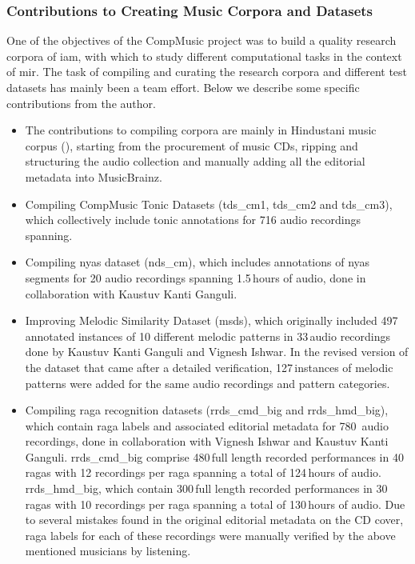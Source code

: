 \subsubsection*{Contributions to Creating Music Corpora and Datasets}

One of the objectives of the CompMusic project was to build a quality research corpora of \gls{iam}, with which to study different computational tasks in the context of \gls{mir}. The task of compiling and curating the research corpora and different test datasets has mainly been a team effort. Below we describe some specific contributions from the author. 

\begin{itemize}
	
	\item The contributions to compiling corpora are mainly in Hindustani music corpus (), starting from the procurement of music CDs, ripping and structuring the audio collection and manually adding all the editorial metadata into MusicBrainz. 
	
	\item Compiling CompMusic Tonic Datasets (\acrshort{tds_cm1}, \acrshort{tds_cm2} and \acrshort{tds_cm3}), which collectively include tonic annotations for 716 audio recordings spanning. 
	
	\item Compiling \Gls{nyas} dataset (\acrshort{nds_cm}), which includes annotations of \gls{nyas} segments for 20 audio recordings spanning 1.5\,hours of audio, done in 
	collaboration with Kaustuv Kanti Ganguli. 
	\item Improving Melodic Similarity Dataset (\acrshort{msds}), which originally included 497 annotated instances of 10 different melodic patterns in 33\,audio recordings done by Kaustuv Kanti Ganguli and Vignesh Ishwar. In the revised version of the dataset that came after a detailed verification, 127\,instances of melodic patterns were added for the same audio recordings and pattern categories. 
	\item Compiling \Gls{raga} recognition datasets (\acrshort{rrds_cmd_big} and \acrshort{rrds_hmd_big}), which contain \gls{raga} labels and associated editorial metadata for 780\, audio recordings, done in collaboration with Vignesh Ishwar and Kaustuv Kanti Ganguli. \acrshort{rrds_cmd_big} comprise 480\,full length recorded performances in 40\,\glspl{raga} with 12 recordings per \gls{raga} spanning a total of 124\,hours of audio. \acrshort{rrds_hmd_big}, which contain 300\,full length recorded performances in 30\,\glspl{raga} with 10 recordings per raga spanning a total of 130\,hours of audio. Due to several mistakes found in the original editorial metadata on the CD cover, \gls{raga} labels for each of these recordings were manually verified by the above mentioned musicians by listening. 
\end{itemize}

